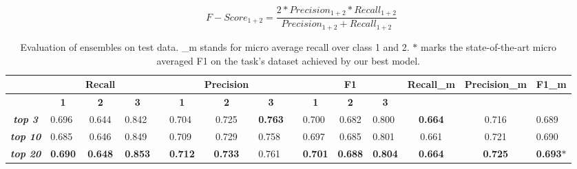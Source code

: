 \documentclass[conference]{IEEEtran}
\begin{document}
\begin{equation}
F-Score_{1+2} = \frac{2*Precision_{1 + 2}*Recall_{1 + 2}}{Precision_{1 + 2} + Recall_{1 + 2}}
\end{equation}

\begin{table}[htbp]
\centering
\tabcolsep=0.10cm
\begin{tabular}{clclllclllclccl}
\textbf{} &  & \textbf{Recall} & \textbf{} & \textbf{} &  & \textbf{Precision} & \textbf{} & \textbf{} &  & \textbf{F1} & \textbf{} & \textbf{Recall\_m} & \textbf{Precision\_m} & \textbf{F1\_m} \\ \hline
\multicolumn{1}{|c|}{} & \multicolumn{1}{c|}{\textbf{1}} & \multicolumn{1}{c|}{\textbf{2}} & \multicolumn{1}{c|}{\textbf{3}} & \multicolumn{1}{c|}{} & \multicolumn{1}{c|}{\textbf{1}} & \multicolumn{1}{c|}{\textbf{2}} & \multicolumn{1}{c|}{\textbf{3}} & \multicolumn{1}{c|}{} & \multicolumn{1}{c|}{\textbf{1}} & \multicolumn{1}{c|}{\textbf{2}} & \multicolumn{1}{c|}{\textbf{3}} & \multicolumn{1}{c|}{\textbf{}} & \multicolumn{1}{c|}{\textbf{}} & \multicolumn{1}{c|}{\textbf{}} \\ \hline
\multicolumn{1}{|c|}{\textit{\textbf{top 3}}} & \multicolumn{1}{l|}{0.696} & \multicolumn{1}{c|}{0.644} & \multicolumn{1}{l|}{0.842} & \multicolumn{1}{l|}{} & \multicolumn{1}{l|}{0.704} & \multicolumn{1}{c|}{0.725} & \multicolumn{1}{l|}{\textbf{0.763}} & \multicolumn{1}{l|}{} & \multicolumn{1}{l|}{0.700} & \multicolumn{1}{c|}{0.682} & \multicolumn{1}{l|}{0.800} & \multicolumn{1}{c|}{\textbf{0.664}} & \multicolumn{1}{c|}{0.716} & \multicolumn{1}{l|}{0.689} \\ \hline
\multicolumn{1}{|c|}{\textit{\textbf{top 10}}} & \multicolumn{1}{l|}{0.685} & \multicolumn{1}{c|}{0.646} & \multicolumn{1}{l|}{0.849} & \multicolumn{1}{l|}{} & \multicolumn{1}{l|}{0.709} & \multicolumn{1}{c|}{0.729} & \multicolumn{1}{l|}{0.758} & \multicolumn{1}{l|}{} & \multicolumn{1}{l|}{0.697} & \multicolumn{1}{c|}{0.685} & \multicolumn{1}{l|}{0.801} & \multicolumn{1}{c|}{0.661} & \multicolumn{1}{c|}{0.721} & \multicolumn{1}{l|}{0.690} \\ \hline
\multicolumn{1}{|c|}{\textit{\textbf{top 20}}} & \multicolumn{1}{l|}{\textbf{0.690}} & \multicolumn{1}{c|}{\textbf{0.648}} & \multicolumn{1}{l|}{\textbf{0.853}} & \multicolumn{1}{l|}{} & \multicolumn{1}{l|}{\textbf{0.712}} & \multicolumn{1}{c|}{\textbf{0.733}} & \multicolumn{1}{l|}{0.761} & \multicolumn{1}{l|}{} & \multicolumn{1}{l|}{\textbf{0.701}} & \multicolumn{1}{c|}{\textbf{0.688}} & \multicolumn{1}{l|}{\textbf{0.804}} & \multicolumn{1}{c|}{\textbf{0.664}} & \multicolumn{1}{c|}{\textbf{0.725}} & \multicolumn{1}{l|}{\textbf{0.693$\ast$}} \\ \hline
\end{tabular}
\caption{Evaluation of ensembles on test data. \_m stands for micro average recall over class 1 and 2. $\ast$ marks the state-of-the-art micro averaged F1 on the task's dataset achieved by our best model.}
\label{table_ensemble_results}
\end{table}
\end{document}
